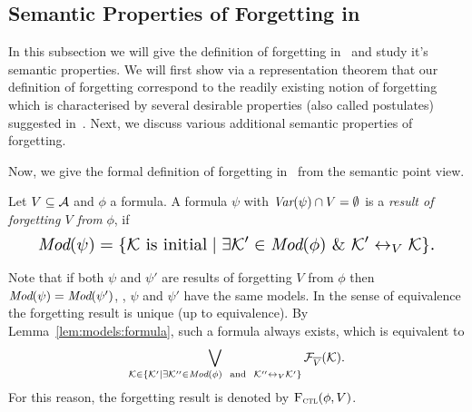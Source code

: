 \documentclass{article}
\begin{document}
\subsection{Semantic Properties of Forgetting in \CTL}
In this subsection we will give the definition of forgetting in \CTL\ and study it's semantic properties.
 We will first show via a representation theorem that our definition of forgetting correspond to the readily existing notion of forgetting which is characterised by several desirable properties (also called postulates) suggested in~\cite{Yan:AIJ:2009}. Next, we discuss various additional semantic properties of forgetting.

Now, we give the formal definition of forgetting in \CTL\ from the semantic point view.
\begin{definition}[Forgetting]\label{def:V:forgetting}
  Let $V\subseteq\cal A$ and $\phi$ a formula.
A formula $\psi$ with $\textit{Var}(\psi)\cap V=\emptyset$
is a {\em result of forgetting $V$ from} $\phi$, if
\begin{equation}
\resizebox{.91\linewidth}{!}{$
\displaystyle
  \Mod(\psi)=\{{\cal K}\mbox{ is initial}\mid \exists {\cal K}'\in\Mod(\phi)\ \&\ {\cal K}'\lrto_V{\cal K}\}.
  $}
\end{equation}
\end{definition}
Note that if both $\psi$ and $\psi'$ are results of forgetting $V$ from $\phi$ then
$\textit{Mod}(\psi)=\textit{Mod}(\psi')$, \ie, $\psi$ and $\psi'$ have the same models. In the sense
of equivalence the forgetting result is unique (up to equivalence).
By Lemma~\ref{lem:models:formula}, such a formula always exists, which
is equivalent to
\begin{equation*}
  \bigvee_{{\cal K}\in  \{{\cal K}'\mid \exists {\cal K}''\in\textit{Mod}(\phi)\ \text{ and }\ {\cal K}''\leftrightarrow_V{\cal K}'\}} {\cal F}_{\overline V}({\cal K}).
\end{equation*}
For this reason, the forgetting result is denoted by ${\textsc{F}_{\textsc{ctl}}}(\phi,V)$.


\end{document}

